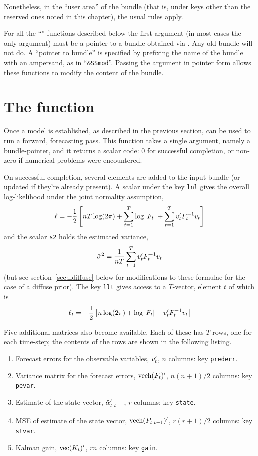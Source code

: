 Nonetheless, in the ``user area'' of the bundle (that is, under keys
other than the reserved ones noted in this chapter), the usual rules
apply.

For all the ``'' functions described below the first argument
(in most cases the only argument) must be a pointer to a bundle
obtained via . Any old bundle will not do. A ``pointer to
bundle'' is specified by prefixing the name of the bundle with an
ampersand, as in ``\verb|&SSmod|''. Passing the argument in pointer
form allows these functions to modify the content of the bundle.

\section{The  function}
\label{sec:kfilter}

Once a model is established, as described in the previous section,
 can be used to run a forward, forecasting pass.  This
function takes a single argument, namely a bundle-pointer, and it
returns a scalar code: 0 for successful completion, or non-zero if
numerical problems were encountered.

On successful completion, several elements are added to the input
bundle (or updated if they're already present).  A scalar under the
key \texttt{lnl} gives the overall log-likelihood under the joint
normality assumption,
%
\[
  \ell = -\frac{1}{2} \left[nT \log(2 \pi) + \sum_{t=1}^T\log \left|F_t\right| + 
    \sum_{t=1}^Tv_t'F_t^{-1} v_t
  \right]
\]
%
and the scalar \texttt{s2} holds the estimated variance,
%
\[
\hat{\sigma}^2 = \frac{1}{nT} 
   \sum_{t=1}^Tv_t'F_t^{-1} v_t
\]
(but see section~\ref{sec:lldiffuse} below for modifications to these
formulae for the case of a diffuse prior).  The key \texttt{llt} gives
access to a $T$-vector, element $t$ of which is
%
\[
  \ell_t = -\frac{1}{2} \left[n \log(2 \pi) + \log \left|F_t\right| + 
    v_t'F_t^{-1} v_t
  \right]
\]
%

Five additional matrices also become available.  Each of these has $T$
rows, one for each time-step; the contents of the rows are shown in
the following listing.
%
\begin{enumerate}
\item Forecast errors for the observable variables, $v_t'$, $n$
  columns: key \texttt{prederr}.
\item Variance matrix for the forecast errors, $\mbox{vech}(F_t)'$,
  $n(n+1)/2$ columns: key \texttt{pevar}.
\item Estimate of the state vector, $\hat{\alpha}_{t|t-1}'$, $r$
  columns: key \texttt{state}.
\item MSE of estimate of the state vector,
  $\mbox{vech}(P_{t|t-1})'$, $r(r+1)/2$ columns: key \texttt{stvar}.
\item Kalman gain, $\mbox{vec}(K_t)'$, $rn$ columns: key
  \texttt{gain}.
\end{enumerate}

